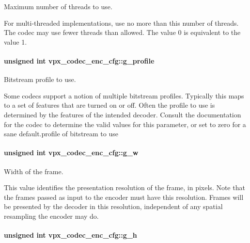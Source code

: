 Maximum number of threads to use. 

For multi-\/threaded implementations, use no more than this number of threads. The codec may use fewer threads than allowed. The value 0 is equivalent to the value 1. \hypertarget{structvpx__codec__enc__cfg_a3d7fe3a8b237338c094d5a956a41804d}{
\paragraph[{g\+\_\+profile}]{\setlength{\rightskip}{0pt plus 5cm}unsigned int vpx\+\_\+codec\+\_\+enc\+\_\+cfg\+::g\+\_\+profile}}\label{structvpx__codec__enc__cfg_a3d7fe3a8b237338c094d5a956a41804d}


Bitstream profile to use. 

Some codecs support a notion of multiple bitstream profiles. Typically this maps to a set of features that are turned on or off. Often the profile to use is determined by the features of the intended decoder. Consult the documentation for the codec to determine the valid values for this parameter, or set to zero for a sane default.\+profile of bitstream to use \hypertarget{structvpx__codec__enc__cfg_a5c165f5b41ca1158f2883983a2b7709c}{
\paragraph[{g\+\_\+w}]{\setlength{\rightskip}{0pt plus 5cm}unsigned int vpx\+\_\+codec\+\_\+enc\+\_\+cfg\+::g\+\_\+w}}\label{structvpx__codec__enc__cfg_a5c165f5b41ca1158f2883983a2b7709c}


Width of the frame. 

This value identifies the presentation resolution of the frame, in pixels. Note that the frames passed as input to the encoder must have this resolution. Frames will be presented by the decoder in this resolution, independent of any spatial resampling the encoder may do. \hypertarget{structvpx__codec__enc__cfg_a4132bd89ce85bce7c08f2cc3b6f2b82e}{
\paragraph[{g\+\_\+h}]{\setlength{\rightskip}{0pt plus 5cm}unsigned int vpx\+\_\+codec\+\_\+enc\+\_\+cfg\+::g\+\_\+h}}\label{structvpx__codec__enc__cfg_a4132bd89ce85bce7c08f2cc3b6f2b82e}


